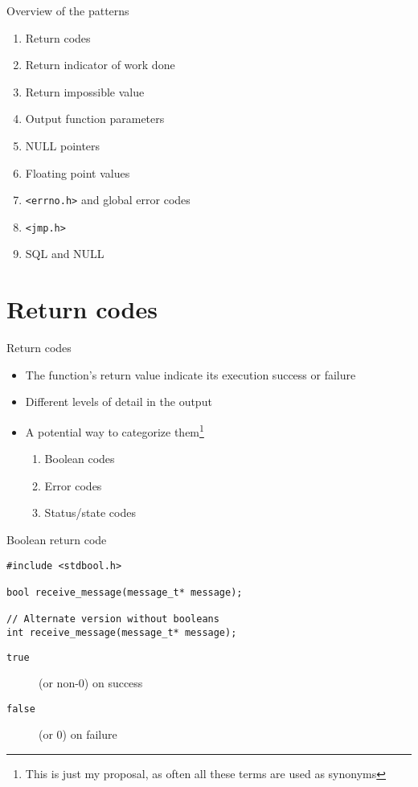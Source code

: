\documentclass[aspectratio=169,14pt]{beamer}
\begin{document}
\begin{frame}{Overview of the patterns}
    \begin{enumerate}
        \item Return codes
        \item Return indicator of work done
        \item Return impossible value
        \item Output function parameters
        \item NULL pointers
        \item Floating point values
        \item \texttt{<errno.h>} and global error codes
        \item \texttt{<jmp.h>}
        \item SQL and NULL
    \end{enumerate}
\end{frame}


\section{Return codes}

\begin{frame}{Return codes}
\begin{itemize}
    \item The function's return value indicate its execution success or failure
    \item Different levels of detail in the output
    \item A potential way to categorize them\footnote{This is just my proposal, as often all these terms are used as synonyms}
    \begin{enumerate}
        \item Boolean codes
        \item Error codes
        \item Status/state codes
    \end{enumerate}
\end{itemize}
\end{frame}

\begin{frame}[fragile]{Boolean return code}
\begin{lstlisting}[style=cstyle]
#include <stdbool.h>

bool receive_message(message_t* message);

// Alternate version without booleans
int receive_message(message_t* message);
\end{lstlisting}

    \begin{description}
        \item[\texttt{true}] (or non-0) on success
        \item[\texttt{false}] (or 0) on failure
    \end{description}
\end{frame}
\end{document}
